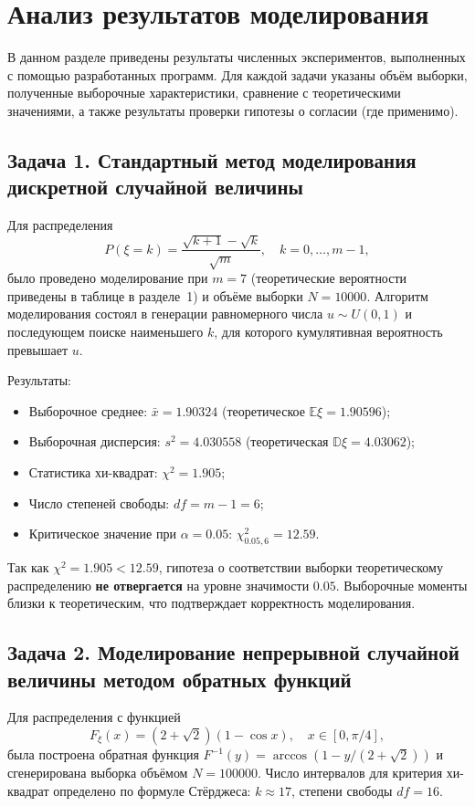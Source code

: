 \documentclass[bachelor, och, pract3]{SCWorks}
\begin{document}
\section{Анализ результатов моделирования}

В данном разделе приведены результаты численных экспериментов, выполненных с помощью разработанных программ. Для каждой задачи указаны объём выборки, полученные выборочные характеристики, сравнение с теоретическими значениями, а также результаты проверки гипотезы о согласии (где применимо).

\subsection{Задача 1. Стандартный метод моделирования дискретной случайной величины}

Для распределения 
\[
P(\xi = k) = \frac{\sqrt{k+1}-\sqrt{k}}{\sqrt{m}}, \quad k=0,\dots,m-1,
\]
было проведено моделирование при $m=7$ (теоретические вероятности приведены в таблице в разделе~1) и объёме выборки $N=10000$. Алгоритм моделирования состоял в генерации равномерного числа $u\sim U(0,1)$ и последующем поиске наименьшего $k$, для которого кумулятивная вероятность превышает $u$.

Результаты:
\begin{itemize}
    \item Выборочное среднее: $\bar{x} = 1.90324$ (теоретическое $\mathbb E\xi = 1.90596$);
    \item Выборочная дисперсия: $s^2 = 4.030558$ (теоретическая $\mathbb D\xi = 4.03062$);
    \item Статистика хи-квадрат: $\chi^2 = 1.905$;
    \item Число степеней свободы: $df = m-1 = 6$;
    \item Критическое значение при $\alpha=0.05$: $\chi^2_{0.05,6} = 12.59$.
\end{itemize}
Так как $\chi^2 = 1.905 < 12.59$, гипотеза о соответствии выборки теоретическому распределению \textbf{не отвергается} на уровне значимости $0.05$. Выборочные моменты близки к теоретическим, что подтверждает корректность моделирования.

\subsection{Задача 2. Моделирование непрерывной случайной величины методом обратных функций}

Для распределения с функцией
\[
F_\xi(x) = (2+\sqrt{2})(1-\cos x), \quad x\in[0,\pi/4],
\]
была построена обратная функция $F^{-1}(y) = \arccos(1 - y/(2+\sqrt{2}))$ и сгенерирована выборка объёмом $N=100000$. Число интервалов для критерия хи-квадрат определено по формуле Стёрджеса: $k \approx 17$, степени свободы $df = 16$.
\end{document}
